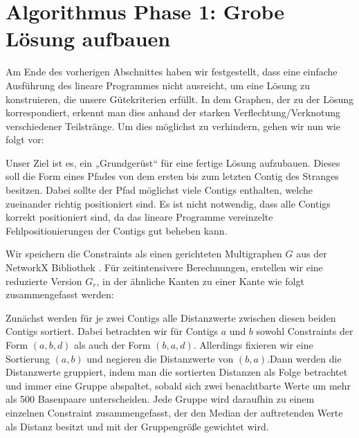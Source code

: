 



\newpage
\chapter{Algorithmus Phase 1: Grobe Lösung aufbauen}\raggedbottom 

Am Ende des vorherigen Abschnittes haben wir festgestellt, dass eine einfache Ausführung des lineare Programmes nicht ausreicht, um eine Lösung zu konstruieren, die unsere Gütekriterien erfüllt. 
In dem Graphen, der zu der Lösung korrespondiert, erkennt man dies anhand der starken Verflechtung/Verknotung verschiedener Teilstränge. Um dies möglichst zu verhindern, gehen wir nun wie folgt vor:

Unser Ziel ist es, ein „Grundgerüst“ für eine fertige Lösung aufzubauen.
Dieses soll die Form eines Pfades von dem ersten bis zum letzten Contig des Stranges besitzen.
Dabei sollte der Pfad möglichst viele Contigs enthalten, welche zueinander richtig positioniert sind.
Es ist nicht notwendig, dass alle Contigs korrekt positioniert sind, da das lineare Programme vereinzelte Fehlpositionierungen der Contigs gut beheben kann. 


Wir speichern die Constraints als einen gerichteten Multigraphen $G$ aus der NetworkX Bibliothek \cite{NetworkX}.
Für zeitintensivere Berechnungen, erstellen wir eine reduzierte Version $G_r$, in der ähnliche Kanten 
zu einer Kante wie folgt zusammengefasst werden:

Zunächst werden für je zwei Contigs alle Distanzwerte zwischen diesen beiden Contigs sortiert. Dabei betrachten wir für Contigs $a$ und $b$ sowohl Constraints der Form $(a, b, d)$ als auch der Form $(b, a, d)$. Allerdings fixieren wir eine Sortierung $(a, b)$ und negieren die Distanzwerte von $(b, a)$.Dann werden die Distanzwerte gruppiert, indem man die sortierten Distanzen als Folge betrachtet und immer eine Gruppe abspaltet, sobald sich zwei benachtbarte Werte um mehr als 500 Basenpaare unterscheiden. Jede Gruppe wird daraufhin zu einem einzelnen Constraint zusammengefasst, der den Median der auftretenden Werte als Distanz besitzt und mit der Gruppengröße gewichtet wird.

